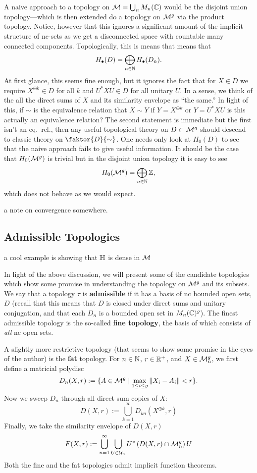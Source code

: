 A naive approach to a topology on \(\mathcal{M} = \bigcup_n M_n(\mathbb{C})\) would be the
disjoint union topology---which is then extended do a topology on \(\mathcal{M}^g\) via
the product topology. Notice, however that this ignores a significant amount of
the implicit structure of nc-sets as we get a disconnected space with countable
many connected components. Topologically, this is means that means that
\[
  H_\bullet (D) = \bigoplus_{n \in \mathbb{N} } H_\bullet(D_n).
\]
At first glance, this seems fine enough, but it ignores the fact that for
\(X \in D\) we require \(X^{\oplus k} \in D\) for all \(k\) and \(U^*XU \in D\)
for all unitary \(U\). In a sense, we think of the all the direct sums of \(X\)
and its similarity envelope as ``the same.'' In light of this, if \(\sim\) is
the equivalence relation that \(X\sim Y\) if \(Y = X^{\oplus k}\) or
\(Y = U^*XU\) {\color{red} is this actually an equivalence relation? The second
statement is immediate but the first isn't an eq.\ rel.},
then any useful topological theory on \(D \subset \mathcal{M}^g\) should descend to
classic theory on \(\faktor{D}{\sim}\). One needs only look at \(H_0(D)\) to see
that the naive approach fails to give useful information. It should be the case
that \(H_0(\mathcal{M}^{g} )\) is trivial but in the disjoint union topology it is easy
to see
\[
  H_0(\mathcal{M}^{g} ) = \bigoplus_{n \in \mathbb{N} } \mathbb{Z} ,
\]
which does not behave as we would expect.

{\color{blue} a note on convergence somewhere.}

\subsection{Admissible Topologies}%
\label{sec:admtopo}

{\color{blue} a cool example is showing that \(\mathbb{H} \) is dense in \(\mathcal{M}\)}

In light of the above discussion, we will present some of the candidate
topologies which show some promise in understanding the topology on \(\mathcal{M}^g\)
and its subsets.
We say that a topology \(\tau\) is \textbf{admissible} if it has a basis of nc
bounded open sets, \(D\) (recall that this means that \(D\) is closed under
direct sums and unitary conjugation, and that each \(D_n\) is a bounded open set
in \(M_n(\mathbb{C})^g\)). The finest admissible topology is the so-called \textbf{fine
  topology},
the basis of which consists of \emph{all} nc open sets.

A slightly more restrictive topology (that seems to show some promise in the eyes
of the author) is the \textbf{fat} topology. For \(n \in \mathbb{N} \),
\(r \in \mathbb{R} ^+\), and \(X \in \mathcal{M}^g_n\), we first define a matricial polydisc
\[
  D_n(X,r) := \{A \in \mathcal{M}^g \mid \max_{1\leq i\leq g} \| X_i-A_i \| <r\}.
\]
Now we sweep \(D_n\) through all direct sum copies of \(X\):
\[
  D(X,r) := \bigcup_{k=1}^\infty D_{kn} (X^{\oplus k},r)
\]
Finally, we take the similarity envelope of \(D(X,r)\)
\[
  F(X,r) :=  \bigcup_{n=1}^\infty \bigcup_{U \in \mathcal{U}_n} U^* \left( D(X,r) \cap \mathcal{M}^g_n \right) U
\]
Both the fine and the fat topologies admit implicit function theorems.

